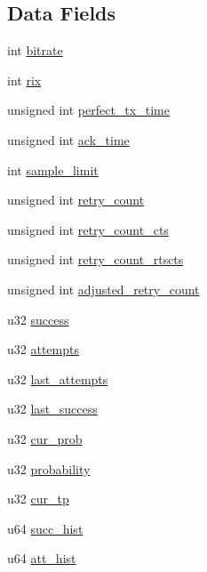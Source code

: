 \subsection*{Data Fields}
\begin{DoxyCompactItemize}
\item 
int \hyperlink{structminstrel__rate_ab5d8e1788d02d0e52941a0778776e289}{bitrate}
\item 
int \hyperlink{structminstrel__rate_a803467ed3226692c9a6ed93a7a9725ce}{rix}
\item 
unsigned int \hyperlink{structminstrel__rate_a96aaa27d9d2e98cac292a49b212f34ae}{perfect\-\_\-tx\-\_\-time}
\item 
unsigned int \hyperlink{structminstrel__rate_a84cfe794c5114005b22f693b28183fcb}{ack\-\_\-time}
\item 
int \hyperlink{structminstrel__rate_ada7982d82ef4893b92944d7b8c871dd2}{sample\-\_\-limit}
\item 
unsigned int \hyperlink{structminstrel__rate_aa01b3f9d6a9f63eb01422e4783c64f09}{retry\-\_\-count}
\item 
unsigned int \hyperlink{structminstrel__rate_aff59bd4c5c6bc9d1639a4dc3bcebb2aa}{retry\-\_\-count\-\_\-cts}
\item 
unsigned int \hyperlink{structminstrel__rate_ade58922c4f5867f4871e88d7d53c92fe}{retry\-\_\-count\-\_\-rtscts}
\item 
unsigned int \hyperlink{structminstrel__rate_a2e1fba3f2815c73ff517aa5971460b1e}{adjusted\-\_\-retry\-\_\-count}
\item 
u32 \hyperlink{structminstrel__rate_a59c45b017ad3e668a0aadd1fb16dabf3}{success}
\item 
u32 \hyperlink{structminstrel__rate_ab31da70a28d3eb0519fe305d260a6f19}{attempts}
\item 
u32 \hyperlink{structminstrel__rate_ab403313e07a99f7f9406c27f5ed25e67}{last\-\_\-attempts}
\item 
u32 \hyperlink{structminstrel__rate_a8b4d399ffe23bc6cdf414328d713ba9f}{last\-\_\-success}
\item 
u32 \hyperlink{structminstrel__rate_a32b192e3ef506ee9c2a8168c37cebabc}{cur\-\_\-prob}
\item 
u32 \hyperlink{structminstrel__rate_a0d6c4038ed9c552705e3b5c4c02c4ead}{probability}
\item 
u32 \hyperlink{structminstrel__rate_a0672074665762bee86be223a6f5a283e}{cur\-\_\-tp}
\item 
u64 \hyperlink{structminstrel__rate_af2ad78ee531872588a173945378c1b51}{succ\-\_\-hist}
\item 
u64 \hyperlink{structminstrel__rate_ad1e0131b84d34b871828347daa221112}{att\-\_\-hist}
\end{DoxyCompactItemize}


